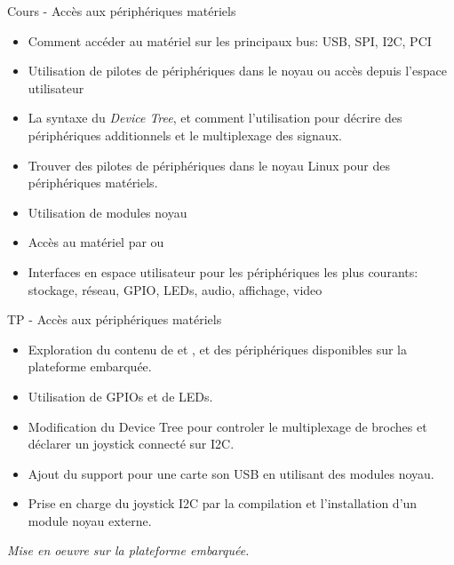 \documentclass[a4paper,12pt,obeyspaces,spaces,hyphens]{article}
\begin{document}
\feagendatwocolumn
{Cours - Accès aux périphériques matériels}
{
  \begin{itemize}
  \item Comment accéder au matériel sur les principaux bus: USB, SPI,
    I2C, PCI
  \item Utilisation de pilotes de périphériques dans le noyau ou accès
    depuis l'espace utilisateur
  \item La syntaxe du {\em Device Tree}, et comment l'utilisation pour
    décrire des périphériques additionnels et le multiplexage des
    signaux.
  \item Trouver des pilotes de périphériques dans le noyau Linux pour
    des périphériques matériels.
  \item Utilisation de modules noyau
  \item Accès au matériel par  ou 
  \item Interfaces en espace utilisateur pour les périphériques les
    plus courants: stockage, réseau, GPIO, LEDs, audio, affichage,
    video
  \end{itemize}
}
{TP - Accès aux périphériques matériels}
{
  \begin{itemize}
  \item Exploration du contenu de  et , et des
    périphériques disponibles sur la plateforme embarquée.
  \item Utilisation de GPIOs et de LEDs.
  \item Modification du Device Tree pour controler le multiplexage
    de broches et déclarer un joystick connecté sur I2C.
  \item Ajout du support pour une carte son USB en utilisant des
    modules noyau.
  \item Prise en charge du joystick I2C par la compilation et
    l'installation d'un module noyau externe.
  \end{itemize}

  \vspace{0.5cm}
  {\em Mise en oeuvre sur la plateforme embarquée.}
}
\end{document}
